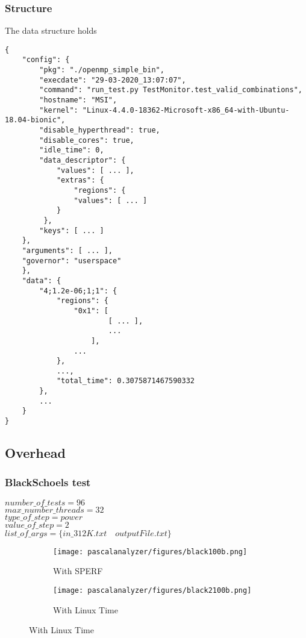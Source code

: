\subsubsection{Structure}
The data structure holds

\begin{lstlisting}
{
    "config": {
        "pkg": "./openmp_simple_bin",
        "execdate": "29-03-2020_13:07:07",
        "command": "run_test.py TestMonitor.test_valid_combinations",
        "hostname": "MSI",
        "kernel": "Linux-4.4.0-18362-Microsoft-x86_64-with-Ubuntu-18.04-bionic",
        "disable_hyperthread": true,
        "disable_cores": true,
        "idle_time": 0,
        "data_descriptor": {
            "values": [ ... ],
            "extras": {
                "regions": {
                "values": [ ... ]
            }
         },
        "keys": [ ... ]
    },
    "arguments": [ ... ],
    "governor": "userspace"
    },
    "data": {
        "4;1.2e-06;1;1": {
            "regions": {
                "0x1": [
                        [ ... ],
                        ...
                    ],
                ...
            },
            ...,
            "total_time": 0.3075871467590332
        },
        ...
    }
}
\end{lstlisting}

\subsection{Overhead}
\subsubsection{BlackSchoels test}

$number\_of\_tests=96$\\
$max\_number\_threads=32$\\
$type\_of\_step=power$\\
$value\_of\_step=2$\\
$list\_of\_args=\{in\_312K.txt \quad outputFile.txt\}$

\begin{figure}[H]
	\centering
	\begin{subfigure}[b]{0.45\textwidth}
	\texttt{[image: pascalanalyzer/figures/black100b.png]}
	\caption{With SPERF}
	\label{fig:black100b}
	\end{subfigure}
	\begin{subfigure}[b]{0.45\textwidth}
	\texttt{[image: pascalanalyzer/figures/black2100b.png]}
	\caption{With Linux Time}
	\label{fig:black2100b}
	\end{subfigure}
\end{figure}

